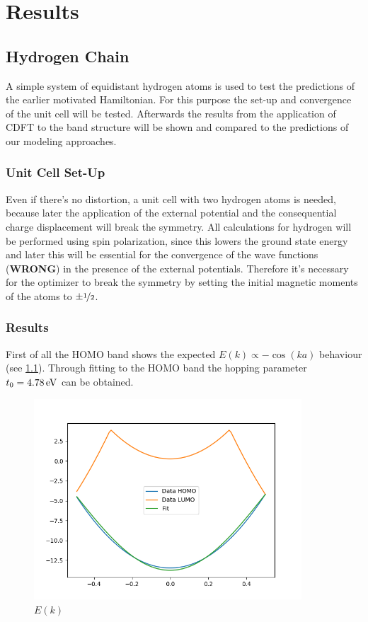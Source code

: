 \chapter{Results}
\section{Hydrogen Chain}

A simple system of equidistant hydrogen atoms is used to test the predictions of the earlier motivated Hamiltonian. For this purpose the set-up and convergence of the unit cell will be tested. Afterwards the results from the application of CDFT to the band structure will be shown and compared to the predictions of our modeling approaches.

\subsection{Unit Cell Set-Up}
Even if there's no distortion, a unit cell with two hydrogen atoms is needed, because later the application of the external potential and the consequential charge displacement will break the symmetry. All calculations for hydrogen will be performed using spin polarization, since this lowers the ground state energy and later this will be essential for the convergence of the wave functions (\textbf{WRONG}) in the presence of the external potentials. Therefore it's necessary for the optimizer to break the symmetry by setting the initial magnetic moments of the atoms to $\pm\nicefrac{1}{2}$. 


\subsection{Results}

First of all the HOMO band shows the expected $E(k)\propto -\cos(ka)$ behaviour (see \cref{image_hydrogen_bandstructure}). Through fitting to the HOMO band the hopping parameter $t_0 = \unit[4.78]{eV}$ can be obtained.

\begin{figure}[!bth]
	\centering
	\includegraphics[width = 10cm]{Images/Hydrogen/hydrogen_bandstructure}
	\caption{$E(k)$}
	\label{image_hydrogen_bandstructure}
\end{figure}

